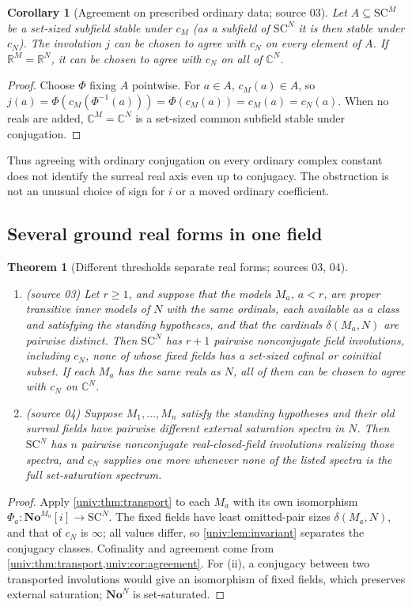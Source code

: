 \documentclass[11pt,letterpaper]{article}
\numberwithin{equation}{section}
\newtheorem{theorem}{Theorem}[section]
\newtheorem{corollary}[corollary]{Corollary}
\theoremstyle{definition}
\theoremstyle{remark}
\newcommand{\No}{\mathbf{No}}
\newcommand{\SC}{\mathrm{SC}}
\newcommand{\NoN}{\No^{N}}
\newcommand{\SCM}{\SC^{M}}
\newcommand{\SCN}{\SC^{N}}
\newcommand{\R}{\mathbb R}
\newcommand{\C}{\mathbb C}
\begin{document}
\begin{corollary}[Agreement on prescribed ordinary data; source 03]\label{univ:cor:agreement}
Let $A\subseteq\SCM$ be a set-sized subfield stable under $c_M$ (as a subfield
of $\SCN$ it is then stable under $c_N$). The involution $j$ can be chosen to
agree with $c_N$ on every element of $A$. If $\R^M=\R^N$, it can be chosen to
agree with $c_N$ on all of $\C^N$.
\end{corollary}
\begin{proof}
Choose $\Phi$ fixing $A$ pointwise. For $a\in A$, $c_M(a)\in A$, so
$j(a)=\Phi(c_M(\Phi^{-1}(a)))=\Phi(c_M(a))=c_M(a)=c_N(a)$. When no reals are
added, $\C^M=\C^N$ is a set-sized common subfield stable under conjugation.
\end{proof}

Thus agreeing with ordinary conjugation on every ordinary complex constant does
not identify the surreal real axis even up to conjugacy. The obstruction is
not an unusual choice of sign for $i$ or a moved ordinary coefficient.

\subsection{Several ground real forms in one field}

\begin{theorem}[Different thresholds separate real forms; sources 03, 04]\label{univ:thm:manygrounds}
\begin{enumerate}[label=\textnormal{(\roman*)}]
\item \textup{(source 03)} Let $r\ge1$, and suppose that the models $M_a$,
$a<r$, are proper transitive inner models of $N$ with the same ordinals, each
available as a class and satisfying the standing hypotheses, and that the
cardinals $\delta(M_a,N)$ are pairwise distinct. Then $\SCN$ has $r+1$ pairwise nonconjugate field
involutions, including $c_N$, none of whose fixed fields has a set-sized
cofinal or coinitial subset. If each $M_a$ has the same reals as $N$, all of
them can be chosen to agree with $c_N$ on $\C^N$.
\item \textup{(source 04)} Suppose $M_1,\ldots,M_n$ satisfy the standing
hypotheses and their old surreal fields have pairwise different external
saturation spectra in $N$. Then $\SCN$ has $n$ pairwise nonconjugate
real-closed-field involutions realizing those spectra, and $c_N$ supplies one
more whenever none of the listed spectra is the full set-saturation spectrum.
\end{enumerate}
\end{theorem}
\begin{proof}
Apply \cref{univ:thm:transport} to each $M_a$ with its own isomorphism
$\Phi_a:\No^{M_a}[i]\to\SCN$. The fixed fields have
least omitted-pair sizes $\delta(M_a,N)$, and that of $c_N$ is $\infty$; all
values differ, so \cref{univ:lem:invariant} separates the conjugacy classes.
Cofinality and agreement come from
\cref{univ:thm:transport,univ:cor:agreement}. For (ii), a conjugacy between two
transported involutions would give an isomorphism of fixed fields, which
preserves external saturation; $\NoN$ is set-saturated.
\end{proof}
\end{document}
